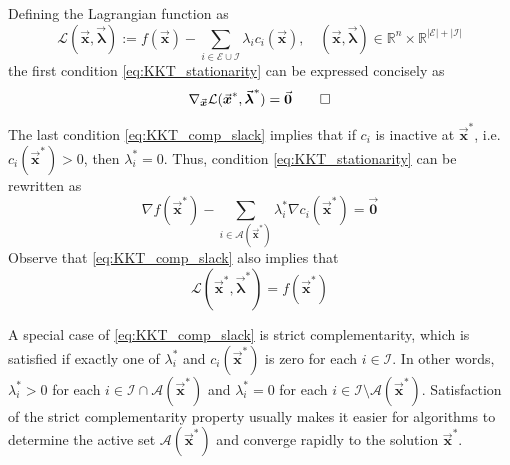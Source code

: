 \documentclass[9pt, headings=standardclasses, parskip=half]{scrartcl}
\renewcommand{\emph}[1]{\textcolor{mypurple}{#1}}
\newcommand{\vect}[1]{\vec{\boldsymbol{#1}}}
\newcommand{\R}{\mathbb{R}}
\begin{document}
Defining the \emph{Lagrangian function} as
\begin{equation}
  \mathcal{L}(\vect{x},\vect{\lambda}) := f(\vect{x}) - \sum_{i\in\mathcal{E}\cup\mathcal{I}} \lambda_{i} c_{i}(\vect{x}), \quad (\vect{x},\vect{\lambda})\in\R^{n}\times\R^{|\mathcal{E}|+|\mathcal{I}|}
\end{equation}
the first condition \eqref{eq:KKT_stationarity} can be expressed concisely as
\begin{equation}
\nabla_{\vect{x}} \mathcal{L}(\vect{x}^{\ast},\vect{\lambda}^{\ast}) = \vect{0} \qedhere
\end{equation}

The last condition \eqref{eq:KKT_comp_slack} implies that if \(c_{i}\) is inactive at \(\vect{x}^{\ast}\), i.e. \(c_{i}(\vect{x}^{\ast}) > 0\), then \(\lambda_{i}^{\ast} = 0\).
Thus, condition \eqref{eq:KKT_stationarity} can be rewritten as
\begin{equation}\label{eq:KKT_stationarity_active}
  \nabla f(\vect{x}^{\ast}) - \sum_{i\in\mathcal{A}(\vect{x}^{\ast})} \lambda_{i}^{\ast} \nabla c_{i}(\vect{x}^{\ast}) = \vect{0}
\end{equation}
Observe that \eqref{eq:KKT_comp_slack} also implies that 
\begin{equation}
  \mathcal{L}(\vect{x}^{\ast},\vect{\lambda}^{\ast}) = f(\vect{x}^{\ast})
\end{equation}




A special case of \eqref{eq:KKT_comp_slack} is \emph{strict complementarity}, which is satisfied if exactly one of \(\lambda_{i}^{\ast}\) and \(c_{i}(\vect{x}^{\ast})\) is zero for each \(i\in\mathcal{I}\).
In other words, \(\lambda_{i}^{\ast} > 0\) for each \(i\in\mathcal{I} \cap \mathcal{A}(\vect{x}^{\ast})\) and \(\lambda_{i}^{\ast} = 0\) for each \(i\in\mathcal{I} \setminus \mathcal{A}(\vect{x}^{\ast})\).
Satisfaction of the strict complementarity property usually makes it easier for algorithms to determine the active set \(\mathcal{A}(\vect{x}^{\ast})\) and converge rapidly to the solution \(\vect{x}^{\ast}\).
\end{document}
